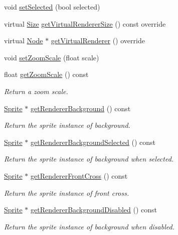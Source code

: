 \begin{DoxyCompactItemize}
void \hyperlink{classui_1_1AbstractCheckButton_aca6eea451771dd184a1cd02984e77cc6}{set\+Selected} (bool selected)
\item 
virtual \hyperlink{classSize}{Size} \hyperlink{classui_1_1AbstractCheckButton_a0ad1948a65d977a254aaf06ca584ad8b}{get\+Virtual\+Renderer\+Size} () const override
\item 
virtual \hyperlink{classNode}{Node} $\ast$ \hyperlink{classui_1_1AbstractCheckButton_a51819285d8bfbe4b135dd09b8c382618}{get\+Virtual\+Renderer} () override
\item 
void \hyperlink{classui_1_1AbstractCheckButton_ab6a9572b00f989f020ec3002af92f904}{set\+Zoom\+Scale} (float scale)
\item 
float \hyperlink{classui_1_1AbstractCheckButton_aa63466704ea2e8d375796d0a1ca4f1b8}{get\+Zoom\+Scale} () const
\begin{DoxyCompactList}\small\item\em Return a zoom scale. \end{DoxyCompactList}\item 
\hyperlink{classSprite}{Sprite} $\ast$ \hyperlink{classui_1_1AbstractCheckButton_addc339c5331dc8427b525d1ccb675f00}{get\+Renderer\+Background} () const
\begin{DoxyCompactList}\small\item\em Return the sprite instance of background. \end{DoxyCompactList}\item 
\hyperlink{classSprite}{Sprite} $\ast$ \hyperlink{classui_1_1AbstractCheckButton_a1ba602c981e86948cc82b020f8e94958}{get\+Renderer\+Background\+Selected} () const
\begin{DoxyCompactList}\small\item\em Return the sprite instance of background when selected. \end{DoxyCompactList}\item 
\hyperlink{classSprite}{Sprite} $\ast$ \hyperlink{classui_1_1AbstractCheckButton_a6527e80f91a37299249d5b95e6d32a17}{get\+Renderer\+Front\+Cross} () const
\begin{DoxyCompactList}\small\item\em Return the sprite instance of front cross. \end{DoxyCompactList}\item 
\hyperlink{classSprite}{Sprite} $\ast$ \hyperlink{classui_1_1AbstractCheckButton_a0dedc2cffba903975cfff7a6c21d90e8}{get\+Renderer\+Background\+Disabled} () const
\begin{DoxyCompactList}\small\item\em Return the sprite instance of background when disabled. \end{DoxyCompactList}\item 

\end{DoxyCompactItemize}
